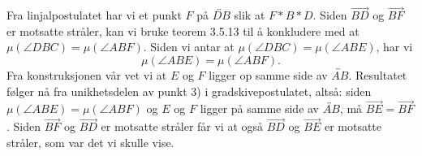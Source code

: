 \begin{oppgave}[3.5.6]
    Fra linjalpostulatet har vi et punkt $F$ på $\overleftrightarrow{DB}$ slik at $F\ast B\ast D$. Siden
    $\overrightarrow{BD}$ og $\overrightarrow{BF}$ er motsatte stråler, kan vi bruke teorem 3.5.13 til å
    konkludere med at $\mu(\angle DBC)=\mu(\angle ABF)$. Siden vi antar at 
    $\mu(\angle DBC)=\mu(\angle ABE)$, har vi $$\mu(\angle ABE)=\mu(\angle ABF).$$
    Fra konstruksjonen vår vet vi at $E$ og $F$ ligger op samme side av $\overleftrightarrow{AB}$. 
    Resultatet følger nå fra unikhetsdelen av punkt 3) i gradskivepostulatet, altså: siden 
    $\mu(\angle ABE)=\mu(\angle ABF)$ og $E$ og $F$ ligger på samme side av $\overleftrightarrow{AB}$, 
    må $\overrightarrow{BE}=\overrightarrow{BF}$. Siden $\overrightarrow{BF}$ og $\overrightarrow{BD}$ 
    er motsatte stråler får vi at også $\overrightarrow{BD}$ og $\overrightarrow{BE}$ er motsatte 
    stråler, som var det vi skulle vise. 
\end{oppgave}